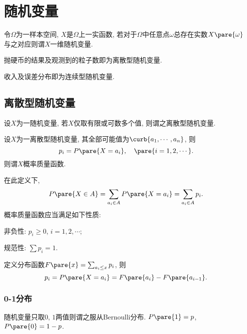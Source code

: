 \documentclass[../Statistics.tex]{subfiles}
\begin{document}
\section{随机变量} %
\label{sec:随机变量}

\begin{definition}[随机变量]
    令$\Omega$为一样本空间, $X$是$\Omega$上一实函数, 若对于$\Omega$中任意点$\omega$总存在实数$X\pare{\omega}$与之对应则谓$X$一维随机变量.
\end{definition}
\begin{ex}[离散型随机变量]
    抛硬币的结果及观测到的粒子数即为离散型随机变量.
\end{ex}
\begin{ex}[连续型随机变量]
    收入及误差分布即为连续型随机变量.
\end{ex}

\subsection{离散型随机变量} %
\label{sub:离散型随机变量}

\begin{definition}[离散型随机变量]
    设$X$为一随机变量, 若$X$仅取有限或可数多个值, 则谓之离散型随机变量.
\end{definition}
\begin{definition}[概率质量函数]
    设$X$为一离散型随机变量, 其全部可能值为$\curb{a_1,\cdots,a_n}$, 则
    \[ p_i = P\pare{X=a_i},\quad \pare{i = 1,2,\cdots}. \]
    则谓$X$概率质量函数.
\end{definition}
在此定义下,
\[ P\pare{X\in A} = \sum_{a_i\in A}P\pare{X=a_i} = \sum_{a_i\in A} p_i. \]
概率质量函数应当满足如下性质:
\begin{cenum}
    \item 非负性: $p_i \ge 0$, $i = 1,2,\cdots$;
    \item 规范性: $\displaystyle \sum p_i = 1$.
\end{cenum}
定义分布函数$F\pare{x} = \sum_{a_i\le x} p_i$, 则
\[ p_i = P\pare{X=a_i} = F\pare{a_i} - F\pare{a_{i-1}}. \]

\subsubsection{0-1分布} %
\label{ssub:0_1分布}

随机变量只取$0$, $1$两值则谓之服从Bernoulli分布. $P\pare{1} = p$, $P\pare{0} = 1-p$.

\end{document}
